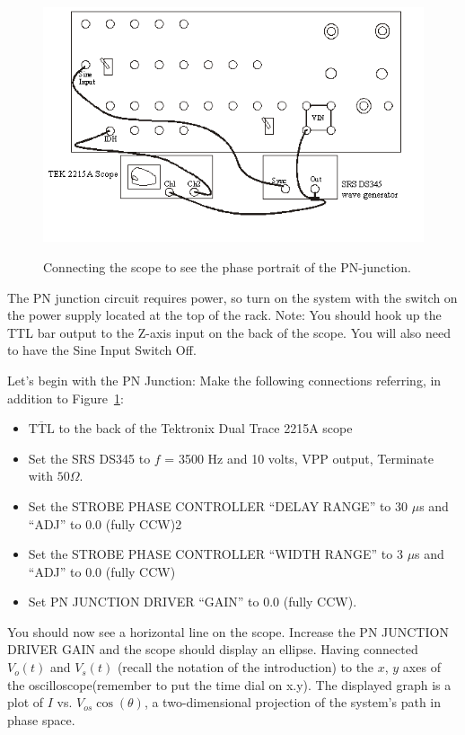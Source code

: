 \documentclass{../lab}
\begin{document}
\begin{figure}[h]
    \centering
    \href{http://experimentationlab.berkeley.edu/sites/default/files/images/Nldimage120.png}{\includegraphics[width=0.7\linewidth]{images/Nldimage120.png}}
    \caption{Connecting the scope to see the phase portrait of the PN-junction.}
    \label{fig:ConnectingTheScope}
\end{figure}

The PN junction circuit requires power, so turn on the system with the switch on the power supply located at the top of the rack. Note: You should hook up the TTL bar output to the Z-axis input on the back of the scope. You will also need to have the Sine Input Switch Off.

Let's begin with the PN Junction: Make the following connections referring, in addition to Figure~\ref{fig:ConnectingTheScope}:

\newpage

\begin{itemize}
    \item $\overline{\text{TTL}}$ to the back of the Tektronix Dual Trace 2215A scope

    \item Set the SRS DS345 to $f$ = 3500 Hz and 10 volts, VPP output, Terminate with $50\Omega$.

    \item Set the STROBE PHASE CONTROLLER ``DELAY RANGE'' to 30 $\mu$s and ``ADJ'' to 0.0 (fully CCW)2

    \item Set the STROBE PHASE CONTROLLER ``WIDTH RANGE'' to 3 $\mu$s and ``ADJ'' to 0.0 (fully CCW)

    \item Set PN JUNCTION DRIVER ``GAIN'' to 0.0 (fully CCW).

\end{itemize}

You should now see a horizontal line on the scope. Increase the PN JUNCTION DRIVER GAIN and the scope should display an ellipse. Having connected $ V_o(t) $ and $ V_s(t) $ (recall the notation of the introduction) to the $x$, $y$ axes of the oscilloscope(remember to put the time dial on x.y). The displayed graph is a plot of $I$ vs. $V_{os} \cos(\theta)$, a two-dimensional projection of the system's path in phase space.
\end{document}
